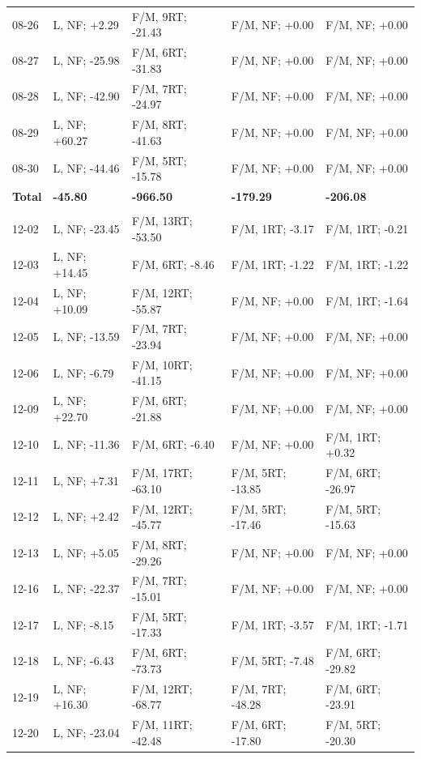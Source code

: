 \begin{table}[H]
\begin{tabular*}{\textwidth}{@{\extracolsep{\fill}} lllll}
08-26 & L, NF; +2.29 & F/M, 9RT; -21.43 & F/M, NF; +0.00 & F/M, NF; +0.00 \\
08-27 & L, NF; -25.98 & F/M, 6RT; -31.83 & F/M, NF; +0.00 & F/M, NF; +0.00 \\
08-28 & L, NF; -42.90 & F/M, 7RT; -24.97 & F/M, NF; +0.00 & F/M, NF; +0.00 \\
08-29 & L, NF; +60.27 & F/M, 8RT; -41.63 & F/M, NF; +0.00 & F/M, NF; +0.00 \\
08-30 & L, NF; -44.46 & F/M, 5RT; -15.78 & F/M, NF; +0.00 & F/M, NF; +0.00 \\
\textbf{Total} & \textbf{-45.80} & \textbf{-966.50} & \textbf{-179.29} & \textbf{-206.08} \\

\addlinespace[0.25em]
\midrule
\multicolumn{5}{@{}l}{\textbf{December 2024}}\\
12-02 & L, NF; -23.45 & F/M, 13RT; -53.50 & F/M, 1RT; -3.17 & F/M, 1RT; -0.21 \\
12-03 & L, NF; +14.45 & F/M, 6RT; -8.46 & F/M, 1RT; -1.22 & F/M, 1RT; -1.22 \\
12-04 & L, NF; +10.09 & F/M, 12RT; -55.87 & F/M, NF; +0.00 & F/M, 1RT; -1.64 \\
12-05 & L, NF; -13.59 & F/M, 7RT; -23.94 & F/M, NF; +0.00 & F/M, NF; +0.00 \\
12-06 & L, NF; -6.79 & F/M, 10RT; -41.15 & F/M, NF; +0.00 & F/M, NF; +0.00 \\
12-09 & L, NF; +22.70 & F/M, 6RT; -21.88 & F/M, NF; +0.00 & F/M, NF; +0.00 \\
12-10 & L, NF; -11.36 & F/M, 6RT; -6.40 & F/M, NF; +0.00 & F/M, 1RT; +0.32 \\
12-11 & L, NF; +7.31 & F/M, 17RT; -63.10 & F/M, 5RT; -13.85 & F/M, 6RT; -26.97 \\
12-12 & L, NF; +2.42 & F/M, 12RT; -45.77 & F/M, 5RT; -17.46 & F/M, 5RT; -15.63 \\
12-13 & L, NF; +5.05 & F/M, 8RT; -29.26 & F/M, NF; +0.00 & F/M, NF; +0.00 \\
12-16 & L, NF; -22.37 & F/M, 7RT; -15.01 & F/M, NF; +0.00 & F/M, NF; +0.00 \\
12-17 & L, NF; -8.15 & F/M, 5RT; -17.33 & F/M, 1RT; -3.57 & F/M, 1RT; -1.71 \\
12-18 & L, NF; -6.43 & F/M, 6RT; -73.73 & F/M, 5RT; -7.48 & F/M, 6RT; -29.82 \\
12-19 & L, NF; +16.30 & F/M, 12RT; -68.77 & F/M, 7RT; -48.28 & F/M, 6RT; -23.91 \\
12-20 & L, NF; -23.04 & F/M, 11RT; -42.48 & F/M, 6RT; -17.80 & F/M, 5RT; -20.30 \\

\end{tabular*}
\end{table}
